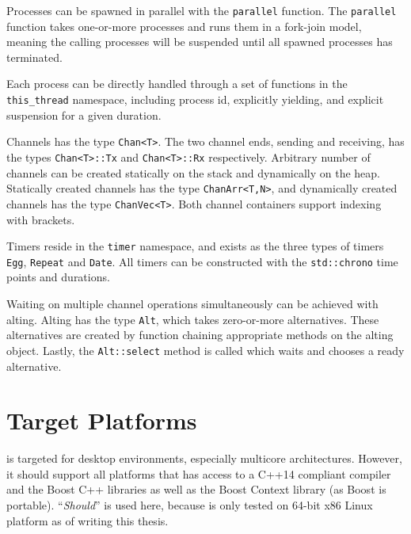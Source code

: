 Processes can be spawned in parallel with the \lstinline[style={CustomC++}]|parallel| function. The \lstinline[style={CustomC++}]|parallel| function takes one\hyp{}or\hyp{}more processes and runs them in a fork\hyp{}join model, meaning the calling processes will be suspended until all spawned processes has terminated.

Each process can be directly handled through a set of functions in the \lstinline[style={CustomC++}]|this_thread| namespace, including process id, explicitly yielding, and explicit suspension for a given duration.

Channels has the type \lstinline[style={CustomC++}]|Chan<T>|. The two channel ends, sending and receiving, has the types \lstinline[style={CustomC++}]|Chan<T>::Tx| and \lstinline[style={CustomC++}]|Chan<T>::Rx| respectively. Arbitrary number of channels can be created statically on the stack and dynamically on the heap. Statically created channels has the type \lstinline[style={CustomC++}]|ChanArr<T,N>|, and dynamically created channels has the type \lstinline[style={CustomC++}]|ChanVec<T>|. Both channel containers support indexing with brackets.

Timers reside in the \lstinline[style={CustomC++}]|timer| namespace, and exists as the three types of timers \lstinline[style={CustomC++}]|Egg|, \lstinline[style={CustomC++}]|Repeat| and \lstinline[style={CustomC++}]|Date|. All timers can be constructed with the \lstinline[style={CustomC++}]|std::chrono| time points and durations.

Waiting on multiple channel operations simultaneously can be achieved with alting. Alting has the type \lstinline[style={CustomC++}]|Alt|, which takes zero\hyp{}or\hyp{}more alternatives. These alternatives are created by function chaining appropriate methods on the alting object. Lastly, the \lstinline[style={CustomC++}]|Alt::select| method is called which waits and chooses a ready alternative.


\section{Target Platforms}
\label{sec:target_platforms}


\Proxc{} is targeted for desktop environments, especially multicore architectures. However, it should support all platforms that has access to a C++14 compliant compiler and the Boost C++ libraries \citep{boost2017boost} as well as the Boost Context library \citep{kowalke2017boost} (as Boost is portable). ``\textit{Should}'' is used here, because \Proxc{} is only tested on 64\hyp{}bit x86 Linux platform as of writing this thesis.


